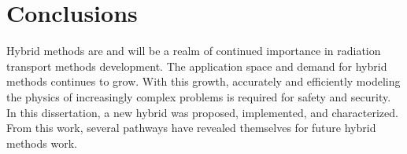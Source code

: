 \chapter{Conclusions}
\label{ch:conclusions}

Hybrid methods are and will be a realm of continued importance in radiation
transport methods development.
The application space and demand for hybrid methods continues to grow. With
this growth, accurately and efficiently modeling the physics of increasingly
complex problems is
required for safety and security. In this dissertation, a new hybrid was
proposed, implemented, and characterized. From this work, several pathways have
revealed themselves for future hybrid methods work.






